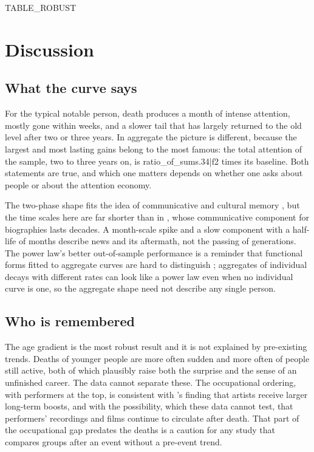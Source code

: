 \documentclass[11pt,a4paper]{article}
\begin{document}
{{TABLE_ROBUST}}

\section{Discussion}\label{sec:disc}
\subsection{What the curve says}
For the typical notable person, death produces a month of intense attention, mostly gone within weeks, and a slower tail that has largely returned to the old level after two or three years. In aggregate the picture is different, because the largest and most lasting gains belong to the most famous: the total attention of the sample, two to three years on, is {{ratio_of_sums.34|f2}} times its baseline. Both statements are true, and which one matters depends on whether one asks about people or about the attention economy.

The two-phase shape fits the idea of communicative and cultural memory \citep{assmann1995,candia2019}, but the time scales here are far shorter than in \citet{candia2019}, whose communicative component for biographies lasts decades. A month-scale spike and a slow component with a half-life of months describe news and its aftermath, not the passing of generations. The power law's better out-of-sample performance is a reminder that functional forms fitted to aggregate curves are hard to distinguish \citep{rubin1996}; aggregates of individual decays with different rates can look like a power law even when no individual curve is one, so the aggregate shape need not describe any single person.

\subsection{Who is remembered}
The age gradient is the most robust result and it is not explained by pre-existing trends. Deaths of younger people are more often sudden and more often of people still active, both of which plausibly raise both the surprise and the sense of an unfinished career. The data cannot separate these. The occupational ordering, with performers at the top, is consistent with \citet{west2021}'s finding that artists receive larger long-term boosts, and with the possibility, which these data cannot test, that performers' recordings and films continue to circulate after death. That part of the occupational gap predates the deaths is a caution for any study that compares groups after an event without a pre-event trend.
\end{document}

